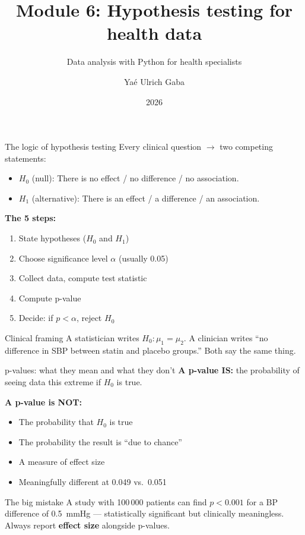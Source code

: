 \documentclass[aspectratio=169,11pt]{beamer}
\title{Module 6: Hypothesis testing for health data}
\subtitle{Data analysis with Python for health specialists}
\author{Yaé Ulrich Gaba}
\institute{AIRINA Labs}
\date{2026}
\begin{document}
\maketitle

\begin{frame}{The logic of hypothesis testing}
Every clinical question $\to$ two competing statements:
\begin{itemize}
  \item $H_0$ (null): There is \alert{no} effect / no difference / no association.
  \item $H_1$ (alternative): There \alert{is} an effect / a difference / an association.
\end{itemize}

\vspace{6pt}
\textbf{The 5 steps:}
\begin{enumerate}
  \item State hypotheses ($H_0$ and $H_1$)
  \item Choose significance level $\alpha$ (usually 0.05)
  \item Collect data, compute test statistic
  \item Compute p-value
  \item Decide: if $p < \alpha$, reject $H_0$
\end{enumerate}

\begin{exampleblock}{Clinical framing}
A statistician writes $H_0: \mu_1 = \mu_2$. A clinician writes ``no difference in SBP between statin and placebo groups.'' Both say the same thing.
\end{exampleblock}
\end{frame}

\begin{frame}{p-values: what they mean and what they don't}
\textbf{A p-value IS:} the probability of seeing data this extreme if $H_0$ is true.

\vspace{6pt}
\textbf{A p-value is NOT:}
\begin{itemize}
  \item The probability that $H_0$ is true
  \item The probability the result is ``due to chance''
  \item A measure of effect size
  \item Meaningfully different at 0.049 vs.\ 0.051
\end{itemize}

\vspace{6pt}
\begin{alertblock}{The big mistake}
A study with 100\,000 patients can find $p < 0.001$ for a BP difference of 0.5~mmHg --- \alert{statistically significant but clinically meaningless}. Always report \textbf{effect size} alongside p-values.
\end{alertblock}
\end{frame}
\end{document}
